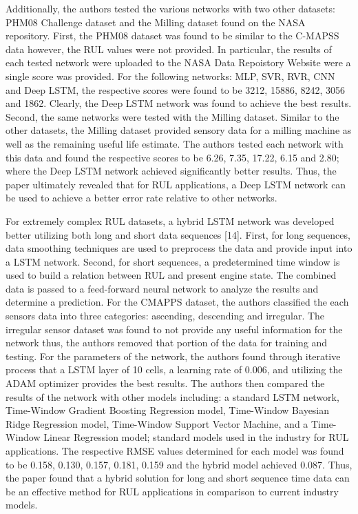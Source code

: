 \documentclass[journal]{IEEEtran}
\begin{document}
Additionally, the authors tested the various networks with two other datasets: PHM08 Challenge dataset and the Milling dataset found on the NASA repository. First, the PHM08 dataset was found to be similar to the C-MAPSS data however, the RUL values were not provided. In particular, the results of each tested network were uploaded to the NASA Data Repoistory Website were a single score was provided. For the following networks: MLP, SVR, RVR, CNN and Deep LSTM, the respective scores were found to be 3212, 15886, 8242, 3056 and 1862. Clearly, the Deep LSTM network was found to achieve the best results. Second, the same networks were tested with the Milling dataset. Similar to the other datasets, the Milling dataset provided sensory data for a milling machine as well as the remaining useful life estimate. The authors tested each network with this data and found the respective scores to be 6.26, 7.35, 17.22, 6.15 and 2.80; where the Deep LSTM network achieved significantly better results. Thus, the paper ultimately revealed that for RUL applications, a Deep LSTM network can be used to achieve a better error rate relative to other networks. 


For extremely complex RUL datasets, a hybrid LSTM network was developed better utilizing both long and short data sequences [14]. First, for long sequences, data smoothing techniques are used to preprocess the data and provide input into a LSTM network. Second, for short sequences, a predetermined time window is used to build a relation between RUL and present engine state. The combined data is passed to a feed-forward neural network to analyze the results and determine a prediction. For the CMAPPS dataset, the authors classified the each sensors data into three categories: ascending, descending and irregular. The irregular sensor dataset was found to not provide any useful information for the network thus, the authors removed that portion of the data for training and testing. For the parameters of the network, the authors found through iterative process that a LSTM layer of 10 cells, a learning rate of 0.006, and utilizing the ADAM optimizer provides the best results. The authors then compared the results of the network with other models including: a standard LSTM network, Time-Window Gradient Boosting Regression model, Time-Window Bayesian Ridge Regression model, Time-Window Support Vector Machine, and a Time-Window Linear Regression model; standard models used in the industry for RUL applications. The respective RMSE values determined for each model was found to be 0.158, 0.130, 0.157, 0.181, 0.159 and the hybrid model achieved 0.087. Thus, the paper found that a hybrid solution for long and short sequence time data can be an effective method for RUL applications in comparison to current industry models. 
\end{document}
